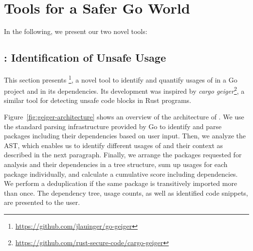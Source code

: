 
\section{Tools for a Safer Go World}
\label{sec:appr}

In the following, we present our two novel tools: 






\subsection{\toolUsage{}: Identification of Unsafe Usage}
\label{sec:appr:toolUsage}

This section presents \toolUsage{}\footnote{\url{https://github.com/jlauinger/go-geiger}}, a novel tool to identify and quantify usages of \unsafe{} in a Go project and in its dependencies. 
Its development was inspired by \textit{cargo geiger}\footnote{\url{https://github.com/rust-secure-code/cargo-geiger}}, a similar tool for detecting unsafe code blocks in Rust programs.


Figure~\ref{fig:geiger-architecture} shows an overview of the architecture of \toolUsage{}.
We use the standard parsing infrastructure provided by Go to identify and parse packages including their dependencies based on user input.
Then, we analyze the AST, %
which enables us to identify different usages of \unsafe{} and their context as described in the next paragraph.
Finally, we arrange the packages requested for analysis and their dependencies in a tree structure, sum up \unsafe{} usages for each package individually, and calculate a cumulative score including dependencies.
We perform a deduplication if the same package is transitively imported more than once.
The \unsafe{} dependency tree, usage counts, as well as identified code snippets, are presented to the user.

